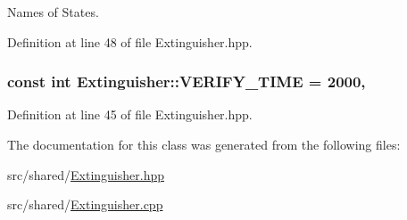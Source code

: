 Names of States. 



Definition at line 48 of file Extinguisher.\-hpp.

\hypertarget{classExtinguisher_a1f4f2c248d5fcf98a62eab8019ab79f9}{
\subsubsection[{V\-E\-R\-I\-F\-Y\-\_\-\-T\-I\-M\-E}]{\setlength{\rightskip}{0pt plus 5cm}const int Extinguisher\-::\-V\-E\-R\-I\-F\-Y\-\_\-\-T\-I\-M\-E = 2000\hspace{0.3cm}{\ttfamily [static]}, {\ttfamily [private]}}}\label{classExtinguisher_a1f4f2c248d5fcf98a62eab8019ab79f9}


Definition at line 45 of file Extinguisher.\-hpp.



The documentation for this class was generated from the following files\-:\begin{DoxyCompactItemize}
\item 
src/shared/\hyperlink{Extinguisher_8hpp}{Extinguisher.\-hpp}\item 
src/shared/\hyperlink{Extinguisher_8cpp}{Extinguisher.\-cpp}\end{DoxyCompactItemize}

